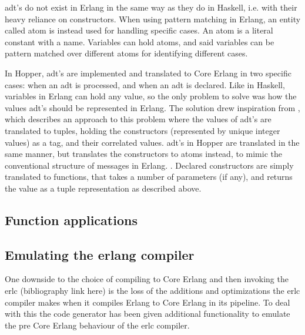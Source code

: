 \gls{adt}'s do not exist in Erlang in the same way as they do in Haskell, i.e. with their heavy reliance
on constructors. When using pattern matching in Erlang, an entity called atom is instead used for
handling specific cases. An atom is a literal constant with a name. Variables can hold atoms, and said
variables can be pattern matched over different atoms for identifying different cases.

In Hopper, \gls{adt}'s are implemented and translated to Core Erlang in two specific cases: when an
\gls{adt} is processed, and when an \gls{adt} is declared. Like in Haskell, variables in Erlang can
hold any value, so the only problem to solve was how the values \gls{adt}'s should be represented in
Erlang. The solution drew inspiration from ,
which describes an approach to this problem where the values of \gls{adt}'s are translated to tuples,
holding the constructors (represented by unique integer values) as a tag, and their correlated values.
\gls{adt}'s in Hopper are translated in the same manner, but translates the constructors to atoms instead,
to mimic the conventional structure of messages in Erlang. .
Declared constructors are simply translated to functions, that takes a number of parameters (if any), and
returns the value as a tuple representation as described above.

\subsection{Function applications}

\subsection{Emulating the erlang compiler}

One downside to the choice of compiling to Core Erlang and then invoking the erlc
(bibliography link here) is the loss of the additions and optimizations the erlc
compiler makes when it compiles Erlang to Core Erlang in its pipeline. To deal with this
the code generator has been given additional functionality to emulate the pre Core Erlang
behaviour of the erlc compiler. 